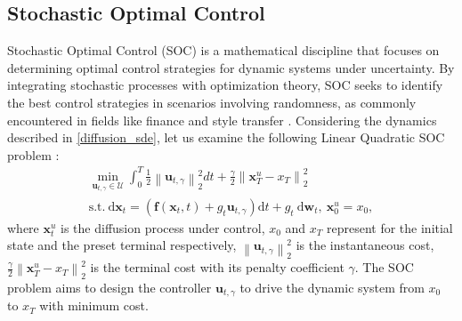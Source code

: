 \subsection{Stochastic Optimal Control}
Stochastic Optimal Control (SOC) is a mathematical discipline that focuses on determining optimal control strategies for dynamic systems under uncertainty. By integrating stochastic processes with optimization theory, SOC seeks to identify the best control strategies in scenarios involving randomness, as commonly encountered in fields like finance \cite{Geering2010} and style transfer \cite{RB}. Considering the dynamics described in \eqref{diffusion_sde}, let us examine the following Linear Quadratic SOC problem \cite{4310229, OConnell2003ConditionedRW, Kappen2008StochasticOC, chen2024generativemodelingphasestochastic}: 
\begin{equation}\label{control_problem_sde}
\begin{gathered}
\min_{\mathbf{u}_{t, \gamma} \in \mathcal{U}} \int_0^T \frac{1}{2} \left\|\mathbf{u}_{t, \gamma}\right\|_2^2 d t+\frac{\gamma}{2}\left\|\mathbf{x}_T^{u}-x_T\right\|_2^2 \\
\text{s.t.} \ \mathrm{d} \mathbf{x}_t = \left( \mathbf{f}(\mathbf{x}_t, t) + g_t \mathbf{u}_{t, \gamma} \right) \mathrm{d} t + g_t \mathrm{~d} \mathbf{w}_t, \ \mathbf{x}_0^u=x_0,
\end{gathered}
\end{equation}
where $\mathbf{x}_t^u$ is the diffusion process under control, $x_0$ and $x_T$ represent for the initial state and the preset terminal respectively, $\left\|\mathbf{u}_{t, \gamma}\right\|_2^2$ is the instantaneous cost, $\frac{\gamma}{2}\left\|\mathbf{x}_T^{u}-x_T\right\|_2^2$ is the terminal cost with its penalty coefficient $\gamma$. The SOC problem aims to design the controller $\mathbf{u}_{t, \gamma}$ to drive the dynamic system from $x_0$ to $x_T$ with minimum cost. 